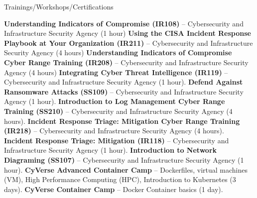 \begin{rubric}{Trainings/Workshops/Certifications}

\entry*[7/03/2025] \textbf{ Understanding Indicators of Compromise (IR108)} -- Cybersecurity and Infrastructure Security Agency (1 hour) \href{https://github.com/amantaya/curriculum-vitae/blob/master/certifications/IR108_JUL2-2025_CertificateofAttendance.pdf}{\scriptsize\faLink}
\entry*[6/24/2025] \textbf{Using the CISA Incident Response Playbook at Your Organization (IR211)} -- Cybersecurity and Infrastructure Security Agency (4 hours) \href{https://github.com/amantaya/curriculum-vitae/blob/master/certifications/IR211_JUN24-2025_CertificateofAttendance.pdf}{\scriptsize\faLink}
\entry*[6/10/2025] \textbf{Understanding Indicators of Compromise Cyber Range Training (IR208)} -- Cybersecurity and Infrastructure Security Agency (4 hours) \href{https://github.com/amantaya/curriculum-vitae/blob/master/certifications/IR208_June10_2025_Course_Completion_Certificate.pdf}{\scriptsize\faLink}
\entry*[6/09/2025] \textbf{Integrating Cyber Threat Intelligence (IR119)} -- Cybersecurity and Infrastructure Security Agency (1 hour). \href{https://github.com/amantaya/curriculum-vitae/blob/master/certifications/IR119_CoC_060925%201.pdf}{\scriptsize\faLink}
\entry*[5/28/2025] \textbf{Defend Against Ransomware Attacks (SS109)} -- Cybersecurity and Infrastructure Security Agency (1 hour). \href{https://github.com/amantaya/curriculum-vitae/blob/master/certifications/SS109_MAY28-2025_CertificateofAttendance.pdf}{\scriptsize\faLink}
\entry*[5/22/2025] \textbf{Introduction to Log Management Cyber Range Training (SS210)} -- Cybersecurity and Infrastructure Security Agency (4 hours). \href{https://github.com/amantaya/curriculum-vitae/blob/master/certifications/SS210_May22_2025_Course_Completion_Certificate.pdf}{\scriptsize\faLink}
\entry*[5/15/2025] \textbf{Incident Response Triage: Mitigation Cyber Range Training (IR218)} -- Cybersecurity and Infrastructure Security Agency (4 hours). \href{https://github.com/amantaya/CV/blob/master/certifications/IR218_COA_051525.pdf}{\scriptsize\faLink}
\entry*[5/12/2025] \textbf{Incident Response Triage: Mitigation (IR118)} -- Cybersecurity and Infrastructure Security Agency (1 hour). \href{https://github.com/amantaya/curriculum-vitae/blob/master/certifications/IR118_CoA_051225.pdf}{\scriptsize\faLink}
\entry*[4/01/2025] \textbf{Introduction to Network Diagraming (SS107)} -- Cybersecurity and Infrastructure Security Agency (1 hour). \href{https://github.com/amantaya/CV/blob/master/certifications/SS107_APR1-2025_CertificateofAttendance.pdf}{\scriptsize\faLink}
\entry*[5/2022] \textbf{CyVerse Advanced Container Camp} -- Dockerfiles, virtual machines (VM), High Performance Computing (HPC), Introduction to Kubernetes (3 days).
\entry*[3/2021] \textbf{CyVerse Container Camp} -- Docker Container basics (1 day).


\end{rubric}

